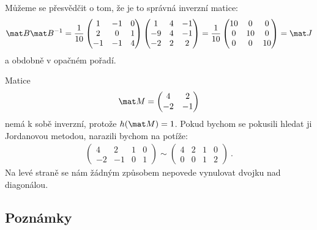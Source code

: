 \begin{example}
    Můžeme se přesvědčit o tom, že je to správná inverzní matice:
    \begin{align}
        \mat B \mat B^{-1} = \frac{1}{10} \begin{pmatrix}
            1 & -1 & 0 \\
            2 & 0 & 1 \\
            -1 & -1 & 4
        \end{pmatrix} \begin{pmatrix}
            1 & 4 & -1 \\
            -9 & 4 & -1 \\
            -2 & 2 & 2
        \end{pmatrix}
        =
        \frac{1}{10}
        \begin{pmatrix}
            10 & 0 & 0 \\ 0 & 10 & 0 \\ 0 & 0 & 10
        \end{pmatrix}
        = \mat J
    \end{align}
    a obdobně v opačném pořadí.
\end{example}

\begin{example}
    Matice \begin{align}
        \mat M = \begin{pmatrix}
            4 & 2 \\
            -2 & -1
        \end{pmatrix}
    \end{align}
    nemá k sobě inverzní, protože $h(\mat M) = 1$. Pokud bychom se pokusili hledat ji Jordanovou metodou, narazili bychom na potíže:
    \begin{align}
        \left(\begin{array}{rr|rr}
            4 & 2 & 1 & 0\\
            -2 & -1 & 0 & 1
        \end{array}\right)
        \sim
        \left(\begin{array}{rr|rr}
            4 & 2 & 1 & 0\\
            0 & 0 & 1 & 2
        \end{array}\right) \:.
    \end{align}
    Na levé straně se nám žádným způsobem nepovede vynulovat dvojku nad diagonálou.
\end{example}

\subsection*{Poznámky}

